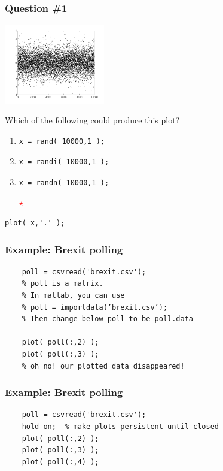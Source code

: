 \documentclass[11pt]{beamer}
\newcommand{\correctstar}{{\Large\textcolor{red}{$\star$}}}
\begin{document}
\begin{frame}[fragile]
  \frametitle{Question \#1}
  \Enlarge

  \includegraphics[width=0.33\textwidth]{./img/plot-normal.png}

Which of the following could produce this plot?

  \begin{enumerate}[label=\Alph*]
    \item
      \begin{Verbatim}
x = rand( 10000,1 );
      \end{Verbatim}
    \item
      \begin{Verbatim}
x = randi( 10000,1 );
      \end{Verbatim}
    \item
    \begin{Verbatim}
x = randn( 10000,1 );
    \end{Verbatim}
    \correctstar
  \end{enumerate}
  \begin{Verbatim}
plot( x,'.' );
  \end{Verbatim}
\end{frame}



\begin{frame}[fragile]
	\frametitle{Example:  Brexit polling}
	
	\begin{Verbatim}
    poll = csvread('brexit.csv');
    % poll is a matrix. 
    % In matlab, you can use 
    % poll = importdata(’brexit.csv’);
    % Then change below poll to be poll.data
    
    plot( poll(:,2) );
    plot( poll(:,3) );
    % oh no! our plotted data disappeared!
	\end{Verbatim}
\end{frame}

\begin{frame}[fragile]
	\frametitle{Example:  Brexit polling}
	
	\begin{Verbatim}
    poll = csvread('brexit.csv');
    hold on;  % make plots persistent until closed
    plot( poll(:,2) );
    plot( poll(:,3) );
    plot( poll(:,4) );
	\end{Verbatim}
\end{frame}
\end{document}
